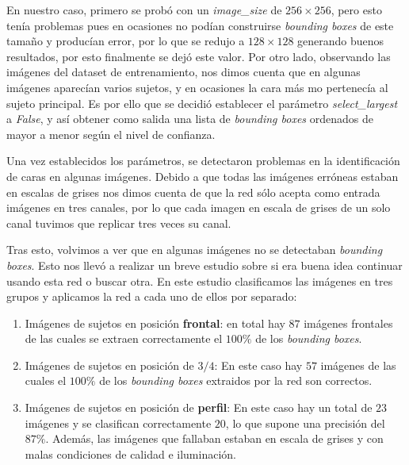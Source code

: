             \noindent En nuestro caso, primero se probó con un \textit{image\_size} de $256 \times 256$, pero esto tenía problemas pues en ocasiones no podían construirse \textit{bounding boxes} de este tamaño y producían error, por lo que se redujo a $128 \times 128$ generando buenos resultados, por esto finalmente se dejó este valor. Por otro lado, observando las imágenes del dataset de entrenamiento, nos dimos cuenta que en algunas imágenes aparecían varios sujetos, y en ocasiones la cara más  mo pertenecía al sujeto principal. Es por ello que se decidió establecer el parámetro \textit{select\_largest} a \textit{False}, y así obtener como salida una lista de \textit{bounding boxes} ordenados de mayor a menor según el nivel de confianza.

            \medskip

            \noindent Una vez establecidos los parámetros, se detectaron problemas en la identificación de caras en algunas imágenes. Debido a que todas las imágenes erróneas estaban en escalas de grises nos dimos cuenta de que la red sólo acepta como entrada imágenes en tres canales, por lo que cada imagen en escala de grises de un solo canal tuvimos que replicar tres veces su canal. 
        
            \medskip
        
            \noindent Tras esto, volvimos a ver que en algunas imágenes no se detectaban \textit{bounding boxes}. Esto nos llevó a realizar un breve estudio sobre si era buena idea continuar usando esta red o buscar otra. En este estudio clasificamos las imágenes en tres grupos y aplicamos la red a cada uno de ellos por separado: 

            \begin{enumerate}
                \item Imágenes de sujetos en posición \textbf{ frontal}: en total hay $87$ imágenes frontales de las cuales se extraen correctamente el \textbf{$100\%$} de los \textit{bounding boxes}.
                \item Imágenes de sujetos en posición de \textbf{$3/4$}: En este caso hay $57$ imágenes de las cuales el \textbf{$100\%$} de los \textit{bounding boxes} extraidos por la red son correctos.
                \item Imágenes de sujetos en posición de \textbf{perfil}: En este caso hay un total de $23$ imágenes y se clasifican correctamente $20$, lo que supone una precisión del \textbf{$87\%$}. Además, las imágenes que fallaban estaban en escala de grises y con malas condiciones de calidad e iluminación.
            \end{enumerate}

